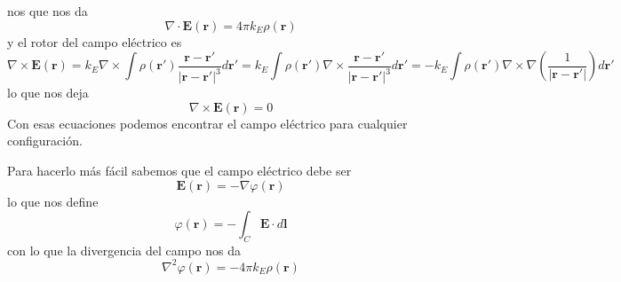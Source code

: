\documentclass{article}
\numberwithin{equation}{section} %
\renewcommand{\vec}[1]{\boldsymbol{#1}}
\begin{document}
nos que nos da
\begin{equation}
\nabla \cdot \vec{E}(\vec{r}) = 4\pi k_E \rho(\vec{r})
\label{eq:gauss_diff}
\end{equation}
y el rotor del campo eléctrico es
\[\nabla \times \vec{E}(\vec{r}) = k_E \nabla \times \int \rho(\vec{r}') \frac{\vec{r} - \vec{r}'}{|\vec{r} - \vec{r}'|^3} d\vec{r}' = k_E \int \rho(\vec{r}') \nabla \times \frac{\vec{r} - \vec{r}'}{|\vec{r} - \vec{r}'|^3} d\vec{r}' = -k_E \int \rho(\vec{r}') \nabla \times \nabla \left(\frac{1}{|\vec{r} - \vec{r}'|}\right) d\vec{r}'\]
lo que nos deja 
\begin{equation}
\nabla \times \vec{E}(\vec{r}) = 0
\label{eq:electroestatica_rotor}
\end{equation}
Con esas ecuaciones podemos encontrar el campo eléctrico para cualquier configuración.

Para hacerlo más fácil sabemos que el campo eléctrico debe ser
\begin{equation}
 \vec{E}(\vec{r}) = - \nabla \varphi(\vec{r})
 \label{eq:electroestatico_potencial}
\end{equation}
lo que nos define
\begin{equation}
 \varphi(\vec{r}) = - \int_C \vec{E} \cdot d\vec{l}
 \label{eq:electroestatico_potencial_integral}
\end{equation}
con lo que la divergencia del campo nos da
\begin{equation}
 \nabla^2 \varphi(\vec{r}) = - 4  \pi k_E \rho(\vec{r})
\end{equation}
\end{document}
